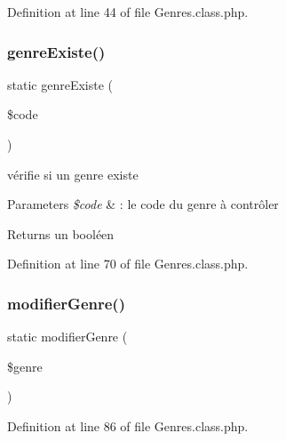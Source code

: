 Definition at line 44 of file Genres.\+class.\+php.

\mbox{\label{class_genres_a22eb0e6b9010a8ca053bded96a59413a}} 
\subsubsection{\texorpdfstring{genre\+Existe()}{genreExiste()}}
{\footnotesize\ttfamily static genre\+Existe (\begin{DoxyParamCaption}\item[{}]{\$code }\end{DoxyParamCaption})\hspace{0.3cm}{\ttfamily [static]}}

vérifie si un genre existe 
\begin{DoxyParams}{Parameters}
{\em \$code} & \+: le code du genre à contrôler \\
\hline
\end{DoxyParams}
\begin{DoxyReturn}{Returns}
un booléen 
\end{DoxyReturn}


Definition at line 70 of file Genres.\+class.\+php.

\mbox{\label{class_genres_a303e349fc6a371e321aaf9d49b47a825}} 
\subsubsection{\texorpdfstring{modifier\+Genre()}{modifierGenre()}}
{\footnotesize\ttfamily static modifier\+Genre (\begin{DoxyParamCaption}\item[{}]{\$genre }\end{DoxyParamCaption})\hspace{0.3cm}{\ttfamily [static]}}



Definition at line 86 of file Genres.\+class.\+php.

\mbox{\label{class_genres_a15c7d28c326ff43eaa69cfccf26ce061}} 

